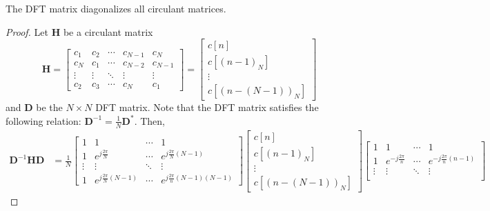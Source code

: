 \documentclass{article}
\begin{document}
\begin{theorem}
    The DFT matrix diagonalizes all circulant matrices.
\end{theorem}
\begin{proof}
    Let \(\bm{H}\) be a circulant matrix
    \begin{equation}
        \bm{H} =
        \begin{bmatrix}
            c_1 & c_2 & \cdots & c_{N - 1} & c_N \\
            c_N & c_1 & \cdots & c_{N - 2} & c_{N - 1} \\
            \vdots & \vdots & \ddots & \vdots & \vdots \\
            c_2 & c_3 & \cdots & c_N & c_1
        \end{bmatrix} =
        \begin{bmatrix}
            c[n] \\
            c[(n - 1)_N] \\
            \vdots \\
            c[(n - (N - 1))_N]
        \end{bmatrix}
    \end{equation}
    and \(\bm{D}\) be the \(N \times N\) DFT matrix.
    Note that the DFT matrix satisfies the following relation: \(\bm{D}^{-1} = \frac{1}{N} \bm{D}^\ast\).
    Then,
    \begin{align}
        \bm{D}^{-1} \bm{H} \bm{D} &=
        \frac{1}{N} \begin{bmatrix}
            1 & 1 & \cdots & 1 \\
            1 & e^{j \frac{2\pi}{N}} & \cdots & e^{j \frac{2\pi}{N} (N - 1)} \\
            \vdots & \vdots & \ddots & \vdots \\
            1 & e^{j \frac{2\pi}{N} (N - 1)} & \cdots & e^{j \frac{2\pi}{n} (N - 1) (N - 1)}
        \end{bmatrix}
        \begin{bmatrix}
            c[n] \\
            c[(n - 1)_N] \\
            \vdots \\
            c[(n - (N - 1))_N]
        \end{bmatrix}
        \begin{bmatrix}
            1 & 1 & \cdots & 1 \\
            1 & e^{-j \frac{2\pi}{n}} & \cdots & e^{-j \frac{2\pi}{n} (n - 1)} \\
            \vdots & \vdots & \ddots & \vdots \\

\end{bmatrix}
\end{align}
\end{proof}
\end{document}
